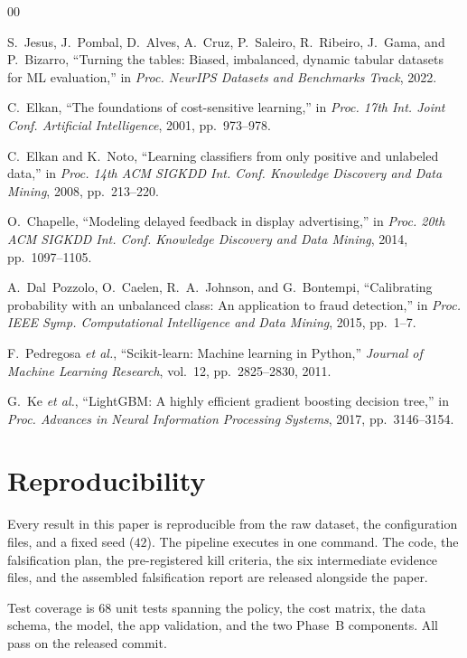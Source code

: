 \documentclass[conference]{IEEEtran}
\begin{document}
\begin{thebibliography}{00}

 S.~Jesus, J.~Pombal, D.~Alves, A.~Cruz, P.~Saleiro,
R.~Ribeiro, J.~Gama, and P.~Bizarro, ``Turning the tables: Biased,
imbalanced, dynamic tabular datasets for ML evaluation,'' in \emph{Proc.
NeurIPS Datasets and Benchmarks Track}, 2022.

 C.~Elkan, ``The foundations of cost-sensitive
learning,'' in \emph{Proc. 17th Int. Joint Conf. Artificial Intelligence},
2001, pp.~973--978.

 C.~Elkan and K.~Noto, ``Learning classifiers from only
positive and unlabeled data,'' in \emph{Proc. 14th ACM SIGKDD Int. Conf.
Knowledge Discovery and Data Mining}, 2008, pp.~213--220.

 O.~Chapelle, ``Modeling delayed feedback in display
advertising,'' in \emph{Proc. 20th ACM SIGKDD Int. Conf. Knowledge
Discovery and Data Mining}, 2014, pp.~1097--1105.

 A.~Dal~Pozzolo, O.~Caelen, R.~A.~Johnson, and
G.~Bontempi, ``Calibrating probability with an unbalanced class: An
application to fraud detection,'' in \emph{Proc. IEEE Symp. Computational
Intelligence and Data Mining}, 2015, pp.~1--7.

 F.~Pedregosa \emph{et al.}, ``Scikit-learn: Machine
learning in Python,'' \emph{Journal of Machine Learning Research}, vol.~12,
pp.~2825--2830, 2011.

 G.~Ke \emph{et al.}, ``LightGBM: A highly efficient
gradient boosting decision tree,'' in \emph{Proc. Advances in Neural
Information Processing Systems}, 2017, pp.~3146--3154.

\end{thebibliography}

\appendices
\section{Reproducibility}

Every result in this paper is reproducible from the raw dataset, the
configuration files, and a fixed seed ($42$). The pipeline executes in one
command. The code, the falsification plan, the pre-registered kill criteria,
the six intermediate evidence files, and the assembled falsification report
are released alongside the paper.

Test coverage is 68 unit tests spanning the policy, the cost matrix, the
data schema, the model, the app validation, and the two Phase~B
components. All pass on the released commit.
\end{document}
